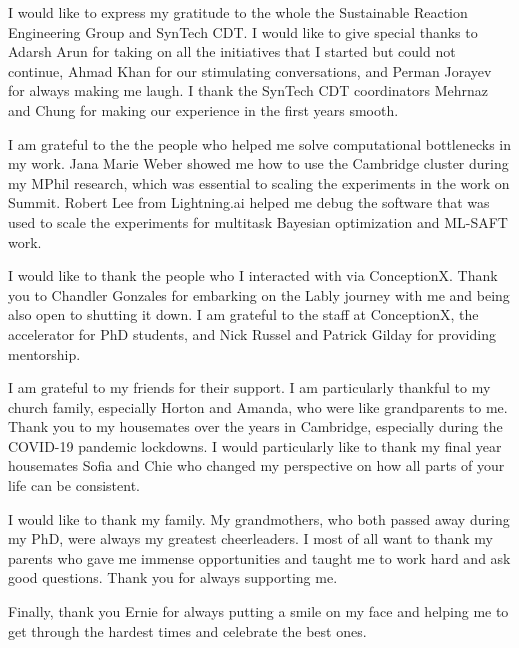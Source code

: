 I would like to express my gratitude to the whole the Sustainable Reaction Engineering Group and SynTech CDT. I would like to give special thanks to Adarsh Arun for taking on all the initiatives that I started but could not continue, Ahmad Khan for our stimulating conversations, and Perman Jorayev for always making me laugh. I thank the SynTech CDT coordinators Mehrnaz and Chung for making our experience in the first years smooth.

I am grateful to the the people who helped me solve computational bottlenecks in my work. Jana Marie Weber showed me how to use the Cambridge cluster during my MPhil research, which was essential to scaling the experiments in the work on Summit. Robert Lee from Lightning.ai helped me debug the software that was used to scale the experiments for multitask Bayesian optimization and ML-SAFT work. 

I would like to thank the people who I interacted with via ConceptionX. Thank you to  Chandler Gonzales  for embarking on the Lably journey with me and being also open to shutting it down.  I am grateful to the staff at ConceptionX, the accelerator for PhD students, and Nick Russel and Patrick Gilday for providing mentorship.  

I am grateful to my friends for their support. I am particularly thankful to my church family, especially Horton and Amanda, who were like grandparents to me. Thank you to my housemates over the years in Cambridge, especially during the COVID-19 pandemic lockdowns. I would particularly like to thank my final year housemates Sofia and Chie who changed my perspective on how all parts of your life can be consistent. 

I would like to thank my family. My grandmothers, who both passed away during my PhD, were always my greatest cheerleaders. I most of all want to thank my parents who gave me immense opportunities and taught me to work hard and ask good questions. Thank you for always supporting me.

Finally, thank you Ernie for always putting a smile on my face and helping me to get through the hardest times and celebrate the best ones.





